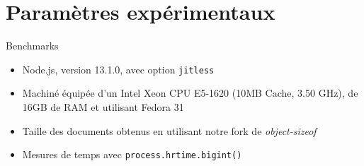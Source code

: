 \section{Paramètres expérimentaux}



\begin{frame}{Benchmarks}
  \begin{itemize}
    \item Node.js, version 13.1.0, avec option \texttt{jitless}
    \item Machiné équipée d'un Intel Xeon CPU E5-1620 (10MB Cache, 3.50 GHz), de 16GB de RAM et utilisant Fedora 31
    \item Taille des documents obtenus en utilisant notre fork de \emph{object-sizeof} 
    \item Mesures de temps avec \texttt{process.hrtime.bigint()}
  \end{itemize}
\end{frame}
